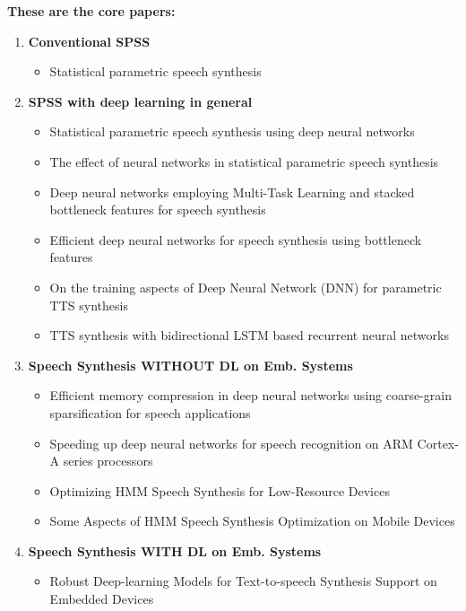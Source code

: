 \newpage

\textbf{These are the core papers:}
\vspace{1em}
\begin{enumerate}[leftmargin=16pt]
	\item \textbf{Conventional \ac{SPSS}}
	\begin{itemize}
		\item Statistical parametric speech synthesis \cite{zen:statistical}
	\end{itemize}
	\vspace{1em}
	\item \textbf{\ac{SPSS} with deep learning in general}
	\begin{itemize}
		\item Statistical parametric speech synthesis using deep neural networks \cite{zen:deepstatistical}
		\item The effect of neural networks in statistical parametric speech synthesis \cite{hashimoto:effect}
		\item \textcolor{black!40}{Deep neural networks employing Multi-Task Learning and stacked bottleneck features for speech synthesis \cite{wu:deep}}
		\item \textcolor{black!40}{Efficient deep neural networks for speech synthesis using bottleneck features \cite{joo:efficient}}
		\item \textcolor{black!40}{On the training aspects of Deep Neural Network (DNN) for parametric TTS synthesis \cite{qian:training}}
		\item \textcolor{black!40}{TTS synthesis with bidirectional LSTM based recurrent neural networks \cite{fan:tts}}
	\end{itemize}
	\vspace{1em}
	\item \textbf{Speech Synthesis WITHOUT DL on Emb. Systems}
	\begin{itemize}
		\item \textcolor{black!40}{Efficient memory compression in deep neural networks using coarse-grain sparsification for speech applications \cite{kadetotad:efficient}}
		\item \textcolor{black!40}{Speeding up deep neural networks for speech recognition on ARM Cortex-A series processors \cite{xing:speeding}}
		\item Optimizing HMM Speech Synthesis for Low-Resource Devices \cite{toth:optimizing}
		\item \textcolor{black!40}{Some Aspects of HMM Speech Synthesis Optimization on Mobile Devices \cite{toth:aspects}}
	\end{itemize}
	\vspace{1em}
	\item \textbf{Speech Synthesis WITH DL on Emb. Systems}
	\begin{itemize}
		\item Robust Deep-learning Models for Text-to-speech Synthesis Support on Embedded Devices \cite{boros:robust}
	\end{itemize}
\end{enumerate}

